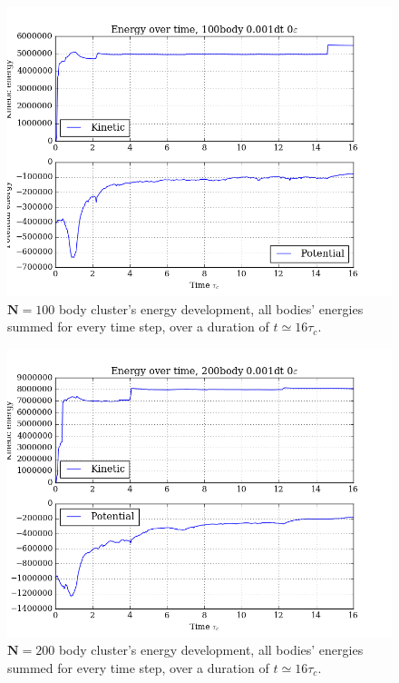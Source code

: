 \documentclass[11pt,a4paper,notitlepage,twocolumn]{article}
\begin{document}
\begin{figure}
[H]\center
\includegraphics[scale=0.35]{../figs/ClusterEnergiesSys_100body_dt1_eps0_dur16.png}
\caption{$\mathbf{N} = 100$ body cluster's energy development, all bodies' energies summed for every time step, over a duration of $t \simeq 16\tau_c$.}\label{fig:N100eps0dur16energy}
\end{figure}
\begin{figure}
[H]\center
\includegraphics[scale=0.35]{../figs/ClusterEnergiesSys_200body_dt1_eps0_dur16.png}
\caption{$\mathbf{N} = 200$ body cluster's energy development, all bodies' energies summed for every time step, over a duration of $t \simeq 16\tau_c$.}
\label{fig:N200eps0dur16energy}
\end{figure}
\end{document}
